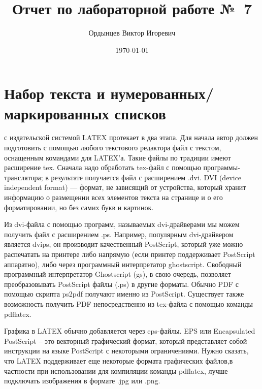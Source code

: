 \documentclass{article} %
\title{Отчет по лабораторной работе №~7}
\author{Ордынцев Виктор Игоревич} %
\date{\today}
\begin{document}
\maketitle %
  
\tableofcontents %

\newpage

\section{Набор текста и нумерованных/маркированных списков}

 с издательской системой LATEX протекает в два этапа. Для начала автор должен подготовить с помощью любого текстового редактора файл с текстом, оснащенным командами для LATEX’а. Такие файлы по традиции имеют расширение tex. Сначала надо обработать tex-файл с помощью программы-транслятора; в результате получается файл с расширением .dvi. DVI (device independent format) — формат, не зависящий от устройства, который хранит информацию о размещении всех элементов текста на странице и о его форматировании, но без самих букв и картинок. 

Из dvi-файла с помощью программ, называемых dvi-драйверами мы можем получить файл с расширением .ps. Например, популярным dvi-драйвером является dvips, он производит качественный PostScript, который уже можно распечатать на принтере либо напрямую (если принтер поддерживает PostScript аппаратно), либо через программный интерпретатор ghostscript. Свободный программный интерпретатор Ghostscript (gs), в свою очередь, позволяет преобразовывать PostScript файлы (.ps) в другие форматы. Обычно PDF с помощью скрипта ps2pdf получают именно из PostScript. Существует также возможность получить PDF непосредственно из tex-файла с помощью команды pdflatex. 

Графика в LATEX обычно добавляется через eps-файлы. EPS или Encapsulated PostScript – это векторный графический формат, который представляет собой инструкции на языке PostScript с некоторыми ограничениями. Нужно сказать, что LATEX поддерживает еще некоторые формата графических файлов,в частности при использовании для компиляции команды pdflatex, лучше подключать изображения в формате .jpg или .png. 
\end{document}
